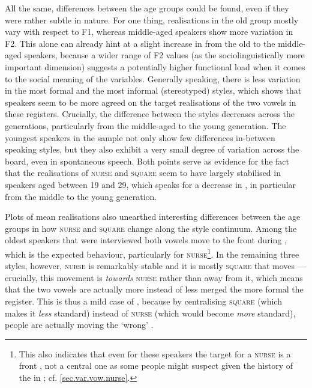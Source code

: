 All the same, differences between the age groups could be found, even if they were rather subtle in nature.
For one thing, realisations in the old group mostly vary with respect to F1, whereas middle-aged speakers show more variation in F2.
This alone can already hint at a slight increase in  from the old to the middle-aged speakers, because a wider range of F2 values (as the sociolinguistically more important dimension) suggests a potentially higher functional load when it comes to the social meaning of the variables.
Generally speaking, there is less variation in the most formal and the most informal (stereotyped) styles, which shows that speakers seem to be more agreed on the target realisations of the two vowels in these registers.
Crucially, the difference between the styles decreases across the generations, particularly from the middle-aged to the young generation.
The youngest speakers in the sample not only show few differences in-between speaking styles, but they also exhibit a very small degree of variation across the board, even in spontaneous speech.
Both points serve as evidence for the fact that the realisations of \textsc{nurse} and \textsc{square} seem to have largely stabilised in speakers aged between 19 and 29, which speaks for a decrease in , in particular from the middle to the young generation.

Plots of mean  realisations also unearthed interesting differences between the age groups in how \textsc{nurse} and \textsc{square} change along the style continuum.
Among the oldest speakers that were interviewed both vowels move to the front during , which is the expected behaviour, particularly for \textsc{nurse}\footnote{This also indicates that even for these speakers the target for a  \textsc{nurse} is a front , not a central one as some people might suspect given the history of the  in ; cf. \ref{sec.var.vow.nurse}.}.
In the remaining three styles, however, \textsc{nurse} is remarkably stable and it is mostly \textsc{square} that moves --- crucially, this movement is \emph{towards} \textsc{nurse} rather than away from it, which means that the two vowels are actually more instead of less merged the more formal the register.
This is thus a mild case of , because by centralising \textsc{square} (which makes it \emph{less} standard) instead of \textsc{nurse} (which would become \emph{more} standard), people are actually moving the `wrong' .

